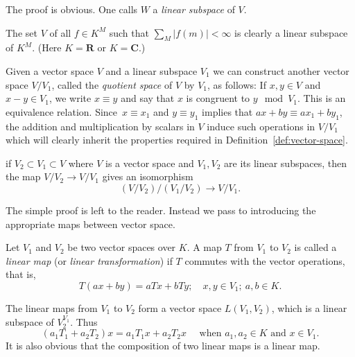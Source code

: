 The proof is obvious. One calls $W$ a \emph{linear subspace} of $V$.
\begin{exa}
  The set $V$ of all $f\in K^M$ such that $\sum_M|f(m)|<\infty$ is
  clearly a linear subspace of $K^M$. (Here $K=\mathbf{R}$ or $K=\mathbf{C}$.)
\end{exa}
Given a vector space $V$ and a linear subspace $V_1$ we can construct
another vector space $V/V_1$, called the \emph{quotient space} of $V$
by $V_1$, as follows: If $x,y\in V$ and $x-y\in V_1$, we write $x\equiv
y$ and say that $x$ is congruent to $y \mod V_1$. This is an
equivalence relation. Since~$x\equiv x_1$ and $y\equiv y_1$ implies
that $ax+by\equiv ax_1+by_1$, the addition and multiplication by
scalars in $V$ induce such operations in $V/V_1$ which will clearly
inherit the properties required in Definition~\ref{def:vector-space}.
\begin{prop}
  if $V_2\subset V_1\subset V$ where $V$ is a vector space and
  $V_1,V_2$ are its linear subspaces, then the map $V/V_2\to V/V_1$
  gives an isomorphism
  \begin{displaymath}
    (V/V_2)/(V_1/V_2)\to V/V_1.
  \end{displaymath}
\end{prop}
The simple proof is left to the reader. Instead we pass to introducing
the appropriate maps between vector space.
\begin{dfn}
  Let $V_1$ and $V_2$ be two vector spaces over $K$. A map $T$ from
  $V_1$ to $V_2$ is called a \emph{linear map} (or \emph{linear
    transformation}) if $T$ commutes with the vector operations, that
  is,
  \begin{displaymath}
    T(ax+by)=aTx+bTy;\quad x,y\in V_1;\ a,b\in K.
  \end{displaymath}
\end{dfn}
The linear maps from $V_1$ to $V_2$ form a vector space $L(V_1,V_2)$,
which is a linear subspace of $V_2^{V_1}$. Thus
\begin{displaymath}
  (a_1T_1+a_2T_2)x=a_1T_1x+a_2T_2x \quad \text{ when } a_1, a_2\in K
  \text{ and } x\in V_1.
\end{displaymath}
It is also obvious that the composition of two linear maps is a linear map.\par
